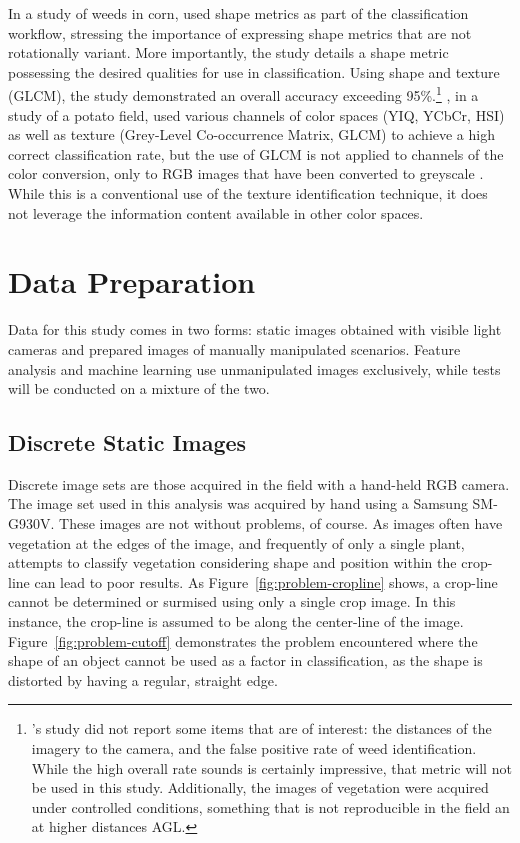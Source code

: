 \documentclass[letterpaper]{article}
\begin{document}
In a study of weeds in corn, \citeauthor{Lin2017-xq} used shape metrics as part of the classification workflow, stressing the importance of expressing shape metrics that are not rotationally variant. More importantly, the study details a shape metric possessing the desired qualities for use in classification. Using shape and texture (GLCM), the study demonstrated an overall accuracy exceeding 95\%.\footnote{\citeauthor{Lin2017-xq}'s study did not report some items that are of interest: the distances of the imagery to the camera, and the false positive rate of weed identification. While the high overall rate sounds is certainly impressive, that metric will not be used in this study. Additionally, the images of vegetation were acquired under controlled conditions, something that is not reproducible in the field an at higher distances AGL.} \citeauthor{Sabzi2020-af}, in a study of a potato field, used various channels of color spaces (YIQ, YCbCr, HSI) as well as texture (Grey-Level Co-occurrence Matrix, GLCM) to achieve a high correct classification rate, but the use of GLCM is not applied  to channels of the color conversion, only to RGB images that have been converted to greyscale \parencite{Sabzi2020-af}. While this is a conventional use of the texture identification technique, it does not leverage the information content available in other color spaces.



\section{Data Preparation}
Data for this study comes in two forms: static images obtained with visible light cameras and prepared images of manually manipulated scenarios.  Feature analysis and machine learning use unmanipulated images exclusively, while tests will be conducted on a mixture of the two.

\subsection{Discrete Static Images}
Discrete image sets are those acquired in the field with a hand-held RGB camera. The image set used in this analysis was acquired by hand using a Samsung SM-G930V. These images are not without problems, of course. As images often have vegetation at the edges of the image, and frequently of only a single plant, attempts to classify vegetation considering shape and position within the crop-line can lead to poor results. As Figure~\ref{fig:problem-cropline} shows, a crop-line cannot be determined or surmised using only a single crop image. In this instance, the crop-line is assumed to be along the center-line of the image. Figure~\ref{fig:problem-cutoff} demonstrates the problem encountered where the shape of an object cannot be used as a factor in classification, as the shape is distorted by having a regular, straight edge.
\end{document}
